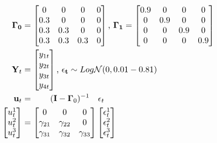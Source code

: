 \documentclass{article}
\begin{document}
\begin{equation*}
\begin{split}
		\bold{\Gamma_0} &= \begin{bmatrix}  0 & 0 & 0 & 0 \\ 0.3 & 0  & 0 & 0 \\0.3 & 0.3  & 0 & 0 \\ 0.3  & 0.3   & 0.3  & 0 \end{bmatrix} \text{, } 
		\bold{\Gamma_1} = \begin{bmatrix}  0.9 & 0 & 0 & 0 \\ 0 & 0.9  & 0 & 0 \\0 & 0  & 0.9 & 0 \\ 0 & 0   & 0  & 0.9 \end{bmatrix}\\
		 \bold{Y}_t &= \begin{bmatrix} y_{1t} \\ y_{2t}  \\ y_{3t} \\ y_{4t} \end{bmatrix}
		 \text{, }\bold{\epsilon_t} \sim Log\mathcal{N}(0,0.01-0.81) \\
		\bold{u}_t &= \qquad (\bold{I} - \bold{\Gamma}_0)^{-1} \quad \bold{\epsilon}_t  \\
		\begin{bmatrix} u_t^{1} \\ u_t^{2}  \\ u_t^{3}  \end{bmatrix} &= 
		\begin{bmatrix}  0 & 0 & 0 \\ \gamma_{21} & \gamma_{22} & 0 \\ \gamma_{31} & \gamma_{32}  & \gamma_{33} \end{bmatrix}  
		\begin{bmatrix} \epsilon_t^{1} \\ \epsilon_t^{2} \\ \epsilon_t^{3} \end{bmatrix} 		
\end{split}
\end{equation*}
\end{document}
